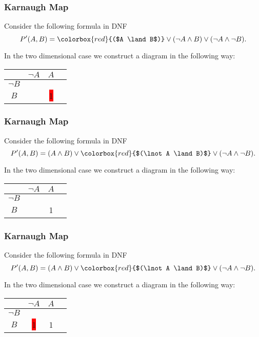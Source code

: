 \documentclass{beamer}
\theoremstyle{remark}
\begin{document}
\begin{frame}
	\frametitle{Karnaugh Map}
	Consider the following formula in DNF
	\[ P^{\prime}(A, B) = \colorbox{red}{($A \land B$)} \lor (\lnot A \land B) \lor (\lnot A \land \lnot B).\]
	
	In the two dimensional case we construct a diagram in the following way:
	
	\vspace{1.5em}
	
	\begin{center}
	\begin{tabular}{c|c|c|c}
		& $\lnot A$ & $A$ \\ \hline
		$\lnot B$ & &  \\ \hline
		$B$ & &  \colorbox{red}{1} \\ \hline
	\end{tabular}
	\end{center}
\end{frame}

\begin{frame}
	\frametitle{Karnaugh Map}
	Consider the following formula in DNF
	\[ P^{\prime}(A, B) = (A \land B) \lor \colorbox{red}{$(\lnot A \land B)$} \lor (\lnot A \land \lnot B).\]
	
	In the two dimensional case we construct a diagram in the following way:
	
	\vspace{1.5em}
	
	\begin{center}
	\begin{tabular}{c|c|c|c}
		& $\lnot A$ & $A$ \\ \hline
		$\lnot B$ & &  \\ \hline
		$B$ & &  1\\ \hline
	\end{tabular}
	\end{center}
\end{frame}

\begin{frame}
	\frametitle{Karnaugh Map}
	Consider the following formula in DNF
	\[ P^{\prime}(A, B) = (A \land B) \lor \colorbox{red}{$(\lnot A \land B)$} \lor (\lnot A \land \lnot B).\]
	
	In the two dimensional case we construct a diagram in the following way:
	
	\vspace{1.5em}
	
	\begin{center}
	\begin{tabular}{c|c|c|c}
		& $\lnot A$ & $A$ \\ \hline
		$\lnot B$ & &  \\ \hline
		$B$ & \colorbox{red}{1}&  1\\ \hline
	\end{tabular}
	\end{center}
\end{frame}
\end{document}

